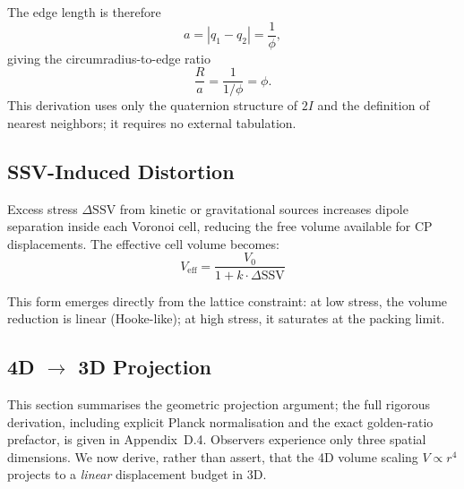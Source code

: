 \documentclass[11pt,letterpaper]{article}
\begin{document}
The edge length is therefore
\[
a = |q_1-q_2| = \frac{1}{\phi},
\]
giving the circumradius-to-edge ratio
\[
\frac{R}{a} = \frac{1}{1/\phi} = \phi.
\]
This derivation uses only the quaternion structure of $2I$ and the 
definition of nearest neighbors; it requires no external tabulation.

\subsection{SSV-Induced Distortion}

Excess stress $\Delta\text{SSV}$ from kinetic or gravitational sources increases 
dipole separation inside each Voronoi cell, reducing the free volume available for 
CP displacements. The effective cell volume becomes:
\begin{equation}
V_\text{eff} = \frac{V_0}{1 + k \cdot \Delta\text{SSV}}
\label{eq:veff}
\end{equation}

This form emerges directly from the lattice constraint: at low stress, the volume reduction is linear (Hooke-like); at high stress, it saturates at the packing limit.

\subsection{4D $\to$ 3D Projection}

This section summarises the geometric projection argument; the full rigorous derivation, including explicit Planck normalisation and the exact golden-ratio prefactor, is given in Appendix~D.4. Observers experience only three spatial dimensions. We now derive, rather than assert, that the 4D volume scaling $V \propto r^4$ projects to a \emph{linear} 
displacement budget in 3D.
\end{document}
